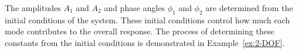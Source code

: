 \documentclass[12pt,letter]{article}
\begin{document}
The amplitudes $A_1$ and $A_2$ and phase angles $\phi_1$ and $\phi_2$ are determined from the initial conditions of the system. These initial conditions control how much each mode contributes to the overall response. The process of determining these constants from the initial conditions is demonstrated in Example~\ref{ex:2-DOF}.

\end{document}
